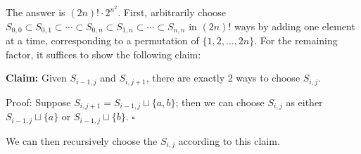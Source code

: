 The answer is $(2n)!\cdot2^{n^2}$. First, arbitrarily choose $S_{0,0}\subset S_{0,1}\subset\cdots\subset S_{0,n}\subset S_{1,n}\subset\cdots\subset S_{n,n}$ in $(2n)!$ ways by adding one element at a time, corresponding to a permutation of $\{1,2,\ldots,2n\}$. For the remaining factor, it suffices to show the following claim:

\textbf{Claim:} Given $S_{i-1,j}$ and $S_{i,j+1}$, there are exactly $2$ ways to choose $S_{i,j}$.

Proof: Suppose $S_{i,j+1}=S_{i-1,j}\sqcup\{a,b\}$; then we can choose $S_{i,j}$ as either $S_{i-1,j}\sqcup\{a\}$ or $S_{i-1,j}\sqcup\{b\}$. $\square$

We can then recursively choose the $S_{i,j}$ according to this claim.